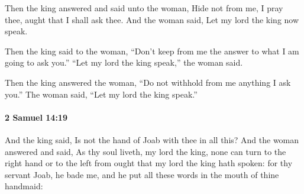 			\begin{versebox}
					\item[BHS] 
					\item[ASV] Then the king answered and said unto the woman, Hide not from me, I pray thee, aught that I shall ask thee. And the woman said, Let my lord the king now speak.
					\item[NIV] Then the king said to the woman, “Don’t keep from me the answer to what I am going to ask you.” “Let my lord the king speak,” the woman said.
					\item[NRSV] Then the king answered the woman, “Do not withhold from me anything I ask you.” The woman said, “Let my lord the king speak.”
			\end{versebox}

		\paragraph{2 Samuel 14:19} %
			\label{2SAMUEL-14-19}

			And the king said, Is not the hand of Joab with thee in all this? And the woman answered and said, As thy soul liveth, my lord the king, none can turn to the right hand or to the left from ought that my lord the king hath spoken: for thy servant Joab, he bade me, and he put all these words in the mouth of thine handmaid:

